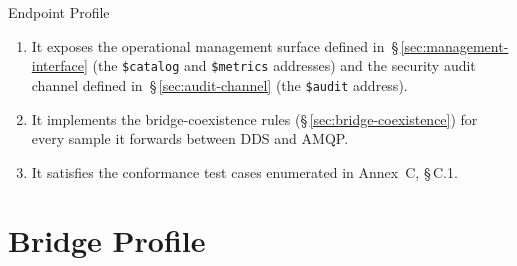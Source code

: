 \documentclass{../styles/zerodds-vendor-spec}
\begin{document}
\begin{conformance}{Endpoint Profile}
\begin{enumerate}
        (\S\,\ref{sec:per-link-governance}).
  \item It exposes the operational management surface defined
        in~\S\,\ref{sec:management-interface} (the
        \texttt{\$catalog} and \texttt{\$metrics} addresses) and
        the security audit channel defined
        in~\S\,\ref{sec:audit-channel} (the \texttt{\$audit}
        address).
  \item It implements the bridge-coexistence rules
        (\S\,\ref{sec:bridge-coexistence}) for every sample it
        forwards between DDS and AMQP.
  \item It satisfies the conformance test cases enumerated in
        Annex~C, \S\,C.1.
\end{enumerate}
\end{conformance}

\section{Bridge Profile}\label{sec:profile-bridge}
\end{document}
